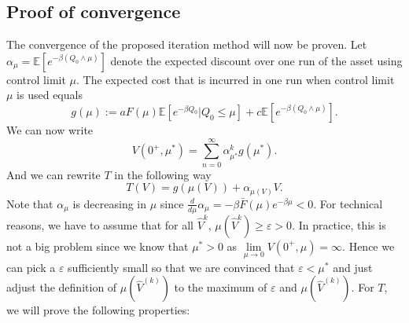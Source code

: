 \documentclass[a4paper]{thesis}
\theoremstyle{definition}
\begin{document}
\subsection{Proof of convergence}
The convergence of the proposed iteration method will now be proven.
Let $\alpha_\mu=\mathbb{E}[e^{-\beta (Q_0\wedge\mu)}]$ denote the expected discount over one run of the asset using control limit $\mu$.
The expected cost that is incurred in one  run when control limit $\mu$ is used equals
$$
g(\mu):=aF(\mu)\mathbb{E}[e^{-\beta Q_0}|Q_0\leq \mu]+c\mathbb{E}[e^{-\beta(Q_0\wedge\mu)}].
$$
We can now write
$$
V(0^+,\mu^*)=\sum\limits_{n=0}^\infty \alpha_{\mu^*}^kg(\mu^*).
$$
And we can rewrite $T$ in the following way
\[
T(V)=g(\mu(V))+\alpha_{\mu(V)}V.
\]
Note that $\alpha_\mu$ is decreasing in $\mu$ since $\frac{d}{d\mu}\alpha_\mu=-\beta\bar F(\mu)e^{-\beta \mu}<0$.
For technical reasons, we have to assume that for all $\hat{V}^{k}$, $\mu(\hat{V}^{k})\geq\varepsilon>0$.
In practice, this is not a big problem since we know that $\mu^*>0$ as $\lim\limits_{\mu\rightarrow 0}V(0^+,\mu)=\infty$.
Hence we can pick a $\varepsilon$ sufficiently small so that we are convinced that $\varepsilon<\mu^*$ and just adjust the definition of $\mu(\hat{V}^{(k)})$ to the maximum of $\varepsilon$ and $\mu(\hat{V}^{(k)})$.
For $T$, we will prove the following properties:
\end{document}
